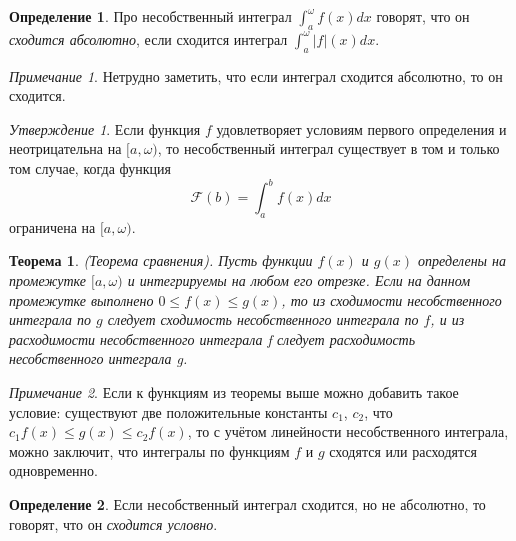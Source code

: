 \documentclass[a4paper,100pt]{article}
\theoremstyle{indented}
\newtheorem{theorem}{Теорема}
\theoremstyle{definition}
\newtheorem{defn}{Определение}
\theoremstyle{remark}
\newtheorem{remark}{Примечание}
\newtheorem{stat}{Утверждение}
\begin{document}
\begin{defn}
    Про несобственный интеграл $\int_a^\omega f(x)dx$ говорят, что он \textit{сходится абсолютно}, если сходится интеграл $\int_a^\omega |f|(x)dx$. 
\end{defn}

\begin{remark}
    Нетрудно заметить, что если интеграл сходится абсолютно, то он сходится.
\end{remark} 

\begin{stat}
    Если функция $f$ удовлетворяет условиям первого определения и неотрицательна на $[a, \omega)$, то несобственный интеграл существует в том и только том случае, когда функция 
    \[
        \mathcal{F}(b)=\int_a^b f(x) dx
    \]
    ограничена на $[a, \omega)$.
\end{stat}

\begin{theorem}
    (Теорема сравнения). Пусть функции $f(x)$ и $g(x)$ определены на промежутке $[a, \omega)$ и интегрируемы на любом его отрезке. Если на данном промежутке выполнено $0\leq f(x) \leq g(x)$, то из сходимости несобственного интеграла по $g$ следует сходимость несобственного интеграла по $f$, и из расходимости несобственного интеграла f следует расходимость несобственного интеграла g. 
\end{theorem}

\begin{remark}
    Если к функциям из теоремы выше можно добавить такое условие: существуют две положительные константы $c_1$, $c_2$, что $c_1f(x)\leq g(x)\leq c_2 f(x)$, то с учётом линейности несобственного интеграла, можно заключит, что интегралы по функциям $f$ и $g$ сходятся или расходятся одновременно.
\end{remark}

\begin{defn}
    Если несобственный интеграл сходится, но не абсолютно, то говорят, что он \textit{сходится условно}.
\end{defn}
\end{document}
